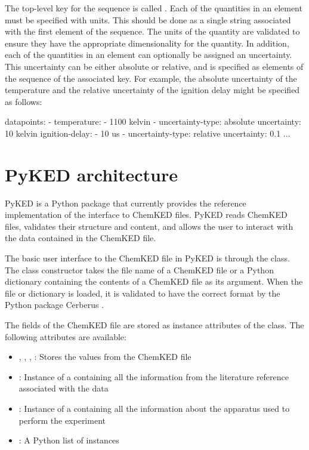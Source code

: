 \documentclass[12pt]{ussci}
\newcommand\ck{ChemKED}
\newcommand\pk{PyKED}
\begin{document}
The top-level key for the sequence is called . Each of the
quantities in an element must be specified with units. This should be done as a
single string associated with the first element of the sequence. The units of
the quantity are validated to ensure they have the appropriate dimensionality
for the quantity. In addition, each of the quantities in an element can
optionally be assigned an uncertainty. This uncertainty can be either absolute
or relative, and is specified as elements of the sequence of the associated key.
For example, the absolute uncertainty of the temperature and the relative
uncertainty of the ignition delay might be specified as follows:

\begin{yamlbox}
datapoints:
  - temperature:
      - 1100 kelvin
      - uncertainty-type: absolute
        uncertainty: 10 kelvin
    ignition-delay:
      - 10 us
      - uncertainty-type: relative
        uncertainty: 0.1
    ...
\end{yamlbox}

\section{PyKED architecture}\label{sec:pyked-architecture}
%
\pk{} is a Python package that currently provides the reference implementation
of the interface to \ck{} files. \pk{} reads \ck{} files, validates their
structure and content, and allows the user to interact with the data contained
in the \ck{} file.

The basic user interface to the \ck{} file in \pk{} is through the
 class. The  class constructor takes the file
name of a \ck{} file or a Python dictionary containing the contents of a \ck{}
file as its argument. When the file or dictionary is loaded, it is validated to
have the correct format by the Python package Cerberus \autocite{cerberus}.

The fields of the \ck{} file are stored as instance attributes of the
 class. The following attributes are available:
%
\begin{itemize}
    \item {}, , ,
    : Stores the values from the \ck{} file
    \item {}: Instance of a  containing all
    the information from the literature reference associated with the data
    \item {}: Instance of a  containing all
    the information about the apparatus used to perform the experiment
    \item {}: A Python list of  instances
\end{itemize}
\end{document}
